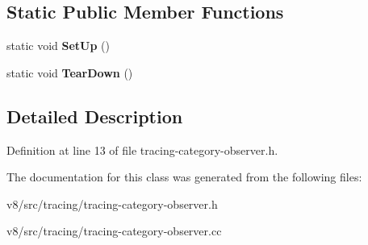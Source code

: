 \subsection*{Static Public Member Functions}
\begin{DoxyCompactItemize}
\item 
\mbox{\label{classv8_1_1tracing_1_1TracingCategoryObserver_a137821162209f9746ad6c035e58bc82a}} 
static void {\bfseries Set\+Up} ()
\item 
\mbox{\label{classv8_1_1tracing_1_1TracingCategoryObserver_a7438eadaf799b35d04e53ceceb1438c0}} 
static void {\bfseries Tear\+Down} ()
\end{DoxyCompactItemize}


\subsection{Detailed Description}


Definition at line 13 of file tracing-\/category-\/observer.\+h.



The documentation for this class was generated from the following files\+:\begin{DoxyCompactItemize}
\item 
v8/src/tracing/tracing-\/category-\/observer.\+h\item 
v8/src/tracing/tracing-\/category-\/observer.\+cc\end{DoxyCompactItemize}
